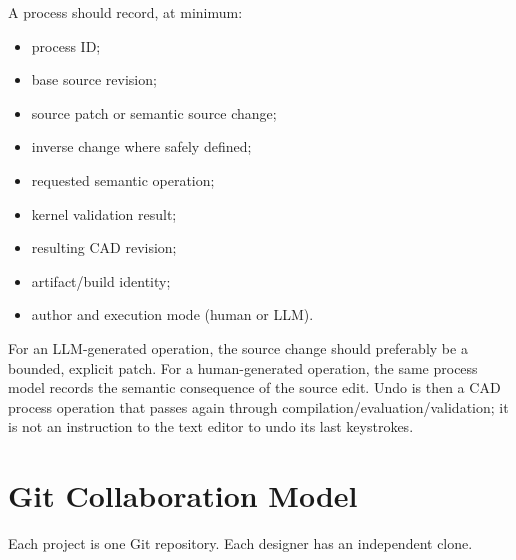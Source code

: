 \documentclass[11pt,a4paper]{article}
\begin{document}
A process should record, at minimum:
\begin{itemize}
    \item process ID;
    \item base source revision;
    \item source patch or semantic source change;
    \item inverse change where safely defined;
    \item requested semantic operation;
    \item kernel validation result;
    \item resulting CAD revision;
    \item artifact/build identity;
    \item author and execution mode (human or LLM).
\end{itemize}

For an LLM-generated operation, the source change should preferably be a bounded, explicit patch. For a human-generated operation, the same process model records the semantic consequence of the source edit. Undo is then a CAD process operation that passes again through compilation/evaluation/validation; it is not an instruction to the text editor to undo its last keystrokes.

\section{Git Collaboration Model}

Each project is one Git repository. Each designer has an independent clone.

\begin{center}
\end{center}
\end{document}
